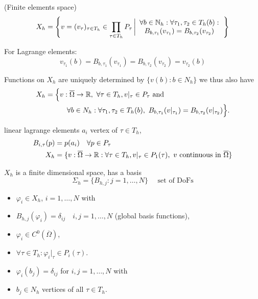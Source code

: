 \begin{definition_}
	(Finite elements space)
	\begin{equation*}
		X_h = \left \{ v = (v_\tau)_{\tau \in T_h} \in \prod \limits_{\tau \in T_h} P_\tau \left|
\begin{array}{c}
\forall b  \in\mathbb{N}_h : \forall \tau_1,\tau_2 \in T_h(b):\\
B_{b,\tau_1}(v_{\tau_1}) = B_{b,\tau_2}(v_{\tau_2}) 
\end{array}		
 \right.\right \}
	\end{equation*}
\end{definition_}
For Lagrange elements:
\begin{equation*}
	v_{\tau_1}(b) = B_{b,\tau_1}(v_{\tau_1}) = B_{b,\tau_2}(v_{\tau_2}) = v_{\tau_2}(b)
\end{equation*}

Functions on $X_h$ are uniquely determined by $\{v(b): b \in N_h \}$ we thus also have 
\begin{align*}
	X_h = \Big \{& v: \overline{\Omega} \to \mathbb{R},\ \forall \tau \in T_h, v|_\tau \in P_\tau \text{ and }\\ &{} \quad \forall b \in N_h: \forall \tau_1,\tau_2 \in T_h(b) ,\ B_{b,\tau_1}(v|_{\tau_1}) = B_{b,\tau_2}(v|_{\tau_2})  \Big\}.
\end{align*}

\begin{example}
	linear lagrange elements $a_i$ vertex of $\tau \in T_h$,
	\begin{align*}
		B_{i,\tau}(p)  &= p(a_i) \quad \forall p \in P_\tau \\
		X_h &= \{ v:\overline{\Omega} \to \mathbb{R} : \forall \tau \in T_h, v|_{\tau} \in P_1(\tau) ,\ v \text{ continuous in } \overline{\Omega} \}
	\end{align*}
\end{example}

$X_h$ is a finite dimensional space, has a basis
\begin{equation*}
	\Sigma_h = \{ B_{h,j} : j= 1,\dots,N  \} \quad \text{ set of DoFs} 
\end{equation*}


\begin{itemize}
	\item $\varphi_i \in X_h$, $ i=1,\dots,N$ with
	\item  $B_{h,j}(\varphi_i) = \delta_{ij} \quad i,j=1,\dots,N$ (global basis functions),
	\item $\varphi_i \in C^0(\overline{\Omega})$,
	\item  $\forall \tau \in T_h: \varphi_i|_\tau \in P_i(\tau)$.
	\item $\varphi_i(b_j) = \delta_{ij}$ for $i,j = 1,\dots,N$ with 
	\item $b_j \in N_h$ vertices of all $\tau \in T_h$.
\end{itemize}

